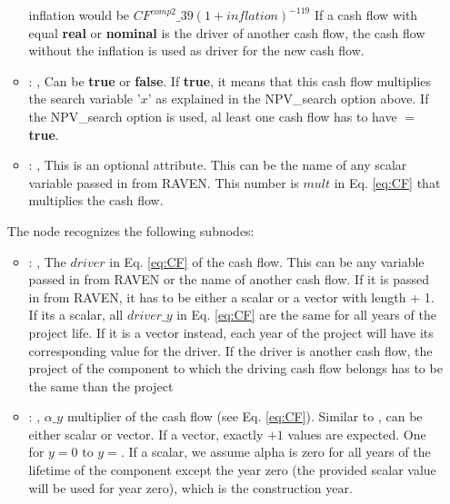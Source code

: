 \begin{itemize}
\begin{itemize}
            inflation would be $CF^{comp2}\_{39}(1+inflation)^{-119}$
            If a cash flow with  equal \textbf{real} or \textbf{nominal} is the
            driver of another cash flow, the cash flow without                               the
            inflation is used as driver for the new cash flow.
          \item {}: , 
            Can be \textbf{true} or \textbf{false}. If \textbf{true}, it means that this cash flow
            multiplies                               the search variable '$x$' as explained in the
            NPV\_search option above.                               If the NPV\_search option is
            used, al least one cash flow has to have $=$\textbf{true}.
          \item {}: , 
            This is an optional attribute. This can be the name of any scalar variable passed in
            from RAVEN. This number                                 is $mult$ in Eq. \ref{eq:CF}
            that multiplies the cash flow.
      \end{itemize}

      The  node recognizes the following subnodes:
      \begin{itemize}
        \item {}: , 
          The $driver$ in Eq. \ref{eq:CF} of the cash flow. This can be any variable passed in from
          RAVEN or the name                               of another cash flow. If it is passed in
          from RAVEN, it has to be either a scalar or a vector with length  + 1.
          If its a scalar, all $driver\_{y}$ in Eq. \ref{eq:CF}  are the same for all years of the
          project life. If it is a vector instead, each                               year of the
          project  will have its corresponding value for the driver. If the
          driver is another                               cash flow, the project
           of the component to which the driving cash flow belongs has to be the
          same than the project

        \item {}: , 
          $\alpha\_{y}$ multiplier of the cash flow (see Eq. \ref{eq:CF}). Similar to
          , can be                               either scalar or vector. If a
          vector, exactly $ + 1$                               values are
          expected. One for $y=0$ to $y=$. If a scalar, we assume alpha is zero
          for all years of the lifetime                               of the component except the
          year zero (the provided scalar value will be used for year zero), which is the
          construction year.
      \end{itemize}
  \end{itemize}


